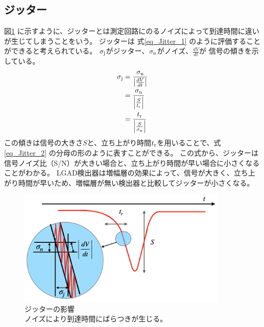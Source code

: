 \subsection{ジッター}
図\ref{fg:Jitter} に示すように、ジッターとは測定回路にのるノイズによって到達時間に違いが生じてしまうことをいう。
ジッターは 式\ref{eq_Jitter_1} のように評価することができると考えられている。
$\sigma_{\rm{j}}$がジッター、$\sigma_{\rm{n}}$がノイズ、$\frac{dV}{dt}$が 信号の傾きを示している。
\begin{align}
    \sigma_{\rm{j}} & = \frac{\sigma_{\rm{n}}}{\left|\frac{dV}{dt}\right|} \label{eq_Jitter_1}\\
             & = \frac{\sigma_{\rm{n}}}{\left|\frac{S}{t_{\rm{r}}}\right|} \notag\\
             & = \frac{t_{\rm{r}}}{\left|\frac{S}{\sigma_{\rm{n}}}\right|} \label{eq_Jitter_2}
\end{align}
この傾きは信号の大きさ$S$と、立ち上がり時間$t_{\rm{r}}$を用いることで、式\ref{eq_Jitter_2} の分母の形のように表すことができる。
この式から、ジッターは信号ノイズ比（S/N）が大きい場合と、立ち上がり時間が早い場合に小さくなることがわかる。
LGAD検出器は増幅層の効果によって、信号が大きく、立ち上がり時間が早いため、増幅層が無い検出器と比較してジッターが小さくなる。

\begin{figure}[h]
    \centering
    \includegraphics[width=10cm]{fig/ch3/Jitter.png}
    \caption[ジッターの影響]{ジッターの影響\\ノイズにより到達時間にばらつきが生じる。}
    \label{fg:Jitter}
\end{figure}


